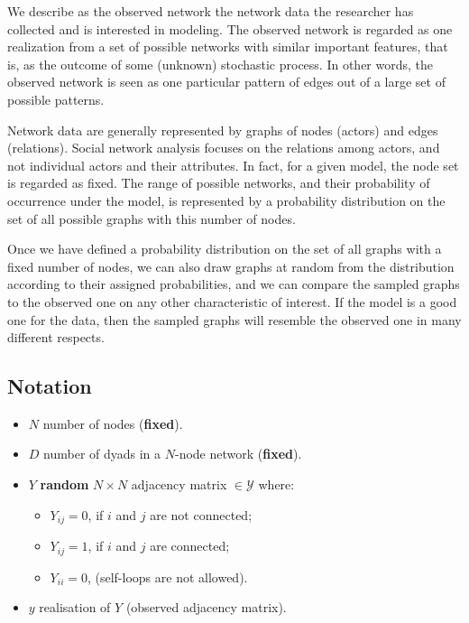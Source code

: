 \documentclass[]{book}
\providecommand{\tightlist}{%
  \setlength{\itemsep}{0pt}\setlength{\parskip}{0pt}}
\begin{document}
We describe as the observed network the network data the researcher has
collected and is interested in modeling. The observed network is
regarded as one realization from a set of possible networks with similar
important features, that is, as the outcome of some (unknown) stochastic
process. In other words, the observed network is seen as one particular
pattern of edges out of a large set of possible patterns.

Network data are generally represented by graphs of nodes (actors) and
edges (relations). Social network analysis focuses on the relations
among actors, and not individual actors and their attributes. In fact,
for a given model, the node set is regarded as fixed. The range of
possible networks, and their probability of occurrence under the model,
is represented by a probability distribution on the set of all possible
graphs with this number of nodes.

Once we have defined a probability distribution on the set of all graphs
with a fixed number of nodes, we can also draw graphs at random from the
distribution according to their assigned probabilities, and we can
compare the sampled graphs to the observed one on any other
characteristic of interest. If the model is a good one for the data,
then the sampled graphs will resemble the observed one in many different
respects.

\subsection{Notation}\label{notation}

\begin{itemize}
\tightlist
\item
  \(N\) number of nodes (\textbf{fixed}).
\item
  \(D\) number of dyads in a \(N\)-node network (\textbf{fixed}).
\item
  \(Y\) \textbf{random} \(N \times N\) adjacency matrix
  \(\in \mathcal{Y}\) where:

  \begin{itemize}
  \tightlist
  \item
    \(Y_{ij} = 0\), if \(i\) and \(j\) are not connected;
  \item
    \(Y_{ij} = 1\), if \(i\) and \(j\) are connected;
  \item
    \(Y_{ii} = 0\), (self-loops are not allowed).
  \end{itemize}
\item
  \(y\) realisation of \(Y\) (observed adjacency matrix).
\end{itemize}
\end{document}

